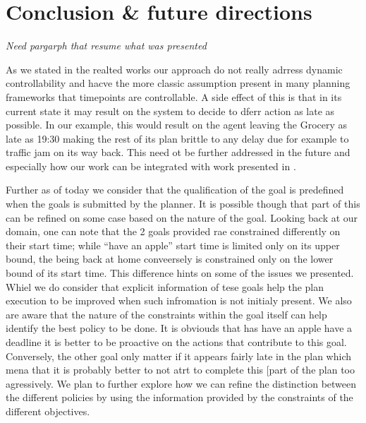 
\section{Conclusion \& future directions}
\label{sec:conclude}


{\em\color{gray} Need pargarph that resume what was presented}


As we stated in the realted works our approach do not really adrress dynamic 
controllability and hacve the more classic assumption present in many planning 
frameworks that timepoints are controllable. A side effect of this is that in its current state it may result on the system to decide to dferr action as late as possible. In our example, this would result on the agent leaving the Grocery as late as 19:30 making the rest of its plan brittle to any delay due for example to traffic jam on its way back. This need ot be further addressed in the future and especially how our work can be integrated with work presented in \cite{morris01}. 

Further as of today we consider that the qualification of the goal is predefined when the goals is submitted by the planner. It is possible though that part of this can be refined on some case based on the nature  of the goal. Looking back at our domain, one can note that the 2 goals provided rae constrained differently on their start time; while ``have an  apple'' start time is limited only on its upper bound, the being back at home conveersely is constrained only on the lower bound of its start time. This difference hints on some of the issues we presented. Whiel we do consider that explicit information of tese goals help the plan execution to be improved when such infromation is not initialy present. We also are aware that the nature of the constraints within the goal itself can help identify the best policy to be done. It is obviouds that has have an apple have a deadline it is better to be proactive on the actions that contribute to this goal. Conversely, the other goal only matter if it appears fairly late in the plan which mena that it is probably better to not atrt to complete this [part of the plan too agressively. We plan to further explore how we can refine the distinction between the different policies by using the information provided by the constraints of the different objectives. 
 
